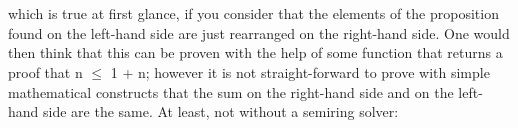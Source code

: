 {\begin{itemize}
\begin{code}%
\>[0]\AgdaSpace{}%
\AgdaSymbol{:}\AgdaSpace{}%
\AgdaSpace{}%
\AgdaSpace{}%
\AgdaSpace{}%
\AgdaSpace{}%
\AgdaSpace{}%
\<%
\\
\>[0][@{}l@{\AgdaIndent{0}}]%
\>[2]\AgdaSpace{}%
\AgdaSpace{}%
\AgdaOperator{\AgdaPrimitive{+}}\AgdaSpace{}%
\AgdaSpace{}%
\AgdaSymbol{((}\AgdaSpace{}%
\AgdaOperator{\AgdaInductiveConstructor{,}}\AgdaSpace{}%
\AgdaSymbol{)}\AgdaSpace{}%
\AgdaSpace{}%
\AgdaSymbol{)}\AgdaSpace{}%
\<%
\\
%
\>[2]\AgdaSpace{}%
\AgdaSymbol{(}\AgdaSpace{}%
\AgdaSymbol{((}\AgdaSpace{}%
\AgdaOperator{\AgdaInductiveConstructor{,}}\AgdaSpace{}%
\AgdaSymbol{)}\AgdaSpace{}%
\AgdaSpace{}%
\AgdaSymbol{)}\AgdaSpace{}%
\AgdaOperator{\AgdaPrimitive{+}}\AgdaSpace{}%
\AgdaSpace{}%
\AgdaSymbol{)}\<%
\end{code}

which is true at first glance, if you consider that the elements of the proposition found on the left-hand side are just rearranged on the right-hand side. One would then think that this can be proven with the help of some function that returns a proof that n $\le$ 1 + n; however it is not straight-forward to prove with simple mathematical constructs that the sum on the right-hand side and on the left-hand side are the same. At least, not without a semiring solver: 


\end{itemize}}
